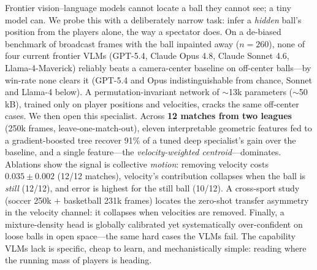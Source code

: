 Frontier vision--language models cannot locate a ball they cannot see; a tiny model can.
We probe this with a deliberately narrow task: infer a \emph{hidden} ball's position from
the players alone, the way a spectator does. On a de-biased benchmark of broadcast frames
with the ball inpainted away ($n=260$), none of four current frontier VLMs (GPT-5.4, Claude
Opus 4.8, Claude Sonnet 4.6, Llama-4-Maverick) reliably beats a camera-center baseline on
off-center balls---by win-rate none clears it (GPT-5.4 and Opus indistinguishable from
chance, Sonnet and Llama-4 below). A permutation-invariant network of $\sim$13k
parameters ($\sim$50\,kB), trained only on player positions and velocities, cracks the same
off-center cases. We then open this
specialist. Across \textbf{12 matches from two leagues} (250k frames, leave-one-match-out),
eleven interpretable geometric features fed to a gradient-boosted tree recover 91\% of a
tuned deep specialist's gain over the baseline, and a single feature---the
\emph{velocity-weighted centroid}---dominates.
Ablations show the signal is collective \emph{motion}: removing velocity costs
$0.035\pm0.002$ (12/12 matches), velocity's contribution collapses when the ball is
\emph{still} (12/12), and error is highest for the still ball (10/12). A cross-sport study
(soccer 250k + basketball 231k frames) locates the zero-shot transfer asymmetry in the
velocity channel: it collapses when velocities are removed. Finally, a mixture-density
head is globally calibrated yet systematically over-confident on loose balls in open
space---the same hard cases the VLMs fail. The capability VLMs lack is specific, cheap
to learn, and mechanistically simple: reading where the running mass of players is
heading.
